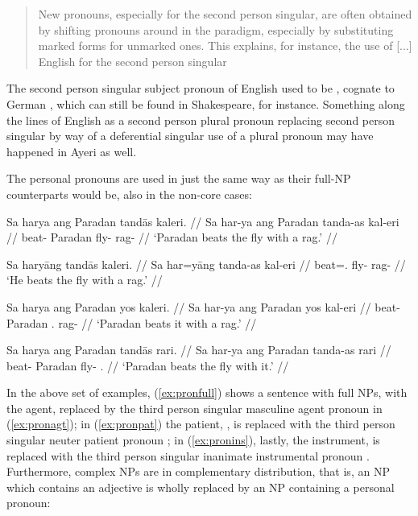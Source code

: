 \blockcquote[42]{lehmann2015}{New pronouns, especially for the second person 
singular, are often obtained by shifting pronouns around in the paradigm,
especially by substituting marked forms for unmarked ones. This explains, for
instance, the use of [...] English  for the second person singular}

The second person singular subject pronoun of English used to be , 
cognate to German , which can still be found in Shakespeare, for 
instance. Something along the lines of English  as a second 
person plural pronoun replacing second person singular  by way of a 
deferential singular use of a plural pronoun \citep[you, pron., adj., and 
n.]{oed} may have happened in Ayeri as well.

The personal pronouns are used in just the same way as their full-NP 
counterparts would be, also in the non-core cases:

\pex\label{ex:perspro}
\a\label{ex:pronfull}\begingl
	\gla Sa harya ang Paradan tandās kaleri. //
	\glb Sa har-ya ang Paradan tanda-as kal-eri //
	\glc \AgtT{} beat-\TsgM{} \Aarg{} Paradan fly-\Parg{} rag-\Ins{} //
	\glft `Paradan beats the fly with a rag.' //
\endgl

\a\label{ex:pronagt}\begingl
	\gla Sa haryāng tandās kaleri. //
	\glb Sa har=yāng tanda-as kal-eri //
	\glc \AgtT{} beat=\TsgM{}.\Aarg{} fly-\Parg{} rag-\Ins{} //
	\glft `He beats the fly with a rag.' //
\endgl

\a\label{ex:pronpat}\begingl
	\gla Sa harya ang Paradan yos kaleri. //
	\glb Sa har-ya ang Paradan yos kal-eri //
	\glc \AgtT{} beat-\TsgM{} \Aarg{} Paradan \TsgN{}.\Parg{} rag-\Ins{} //
	\glft `Paradan beats it with a rag.' //
\endgl

\a\label{ex:pronins}\begingl
	\gla Sa harya ang Paradan tandās rari. //
	\glb Sa har-ya ang Paradan tanda-as rari //
	\glc \AgtT{} beat-\TsgM{} \Aarg{} Paradan fly-\Parg{} \TsgI{}.\Ins{} //
	\glft `Paradan beats the fly with it.' //
\endgl

\xe

In the above set of examples, (\ref{ex:pronfull}) shows a sentence with full
NPs, with the agent,  replaced by the third person
singular masculine agent pronoun  in (\ref{ex:pronagt}); in
(\ref{ex:pronpat}) the patient, , is replaced with the
third person singular neuter patient pronoun ; in
(\ref{ex:pronins}), lastly, the instrument,  is replaced
with the third person singular inanimate instrumental pronoun .
Furthermore, complex NPs are in complementary distribution, that is, an NP
which contains an adjective is wholly replaced by an NP containing a personal
pronoun:

